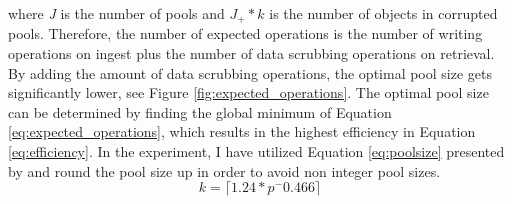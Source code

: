 where \textit{J} is the number of pools and \textit{$J_+ * k$} is the number of objects in corrupted pools. Therefore, the number of expected operations is the number of writing operations on ingest plus the number of data scrubbing operations on retrieval. By adding the amount of data scrubbing operations, the optimal pool size gets significantly lower, see Figure \ref{fig:expected_operations}. The optimal pool size  can be determined by finding the global minimum of Equation \ref{eq:expected_operations}, which results in the highest efficiency in Equation \ref{eq:efficiency}.
In the experiment, I have utilized Equation \ref{eq:poolsize} presented by \cite[3]{regen2020simple} and round the pool size up in order to avoid non integer pool sizes.
\begin{equation}\label{eq:poolsize}
    k = \lceil 1.24*p^-0.466 \rceil
\end{equation}
